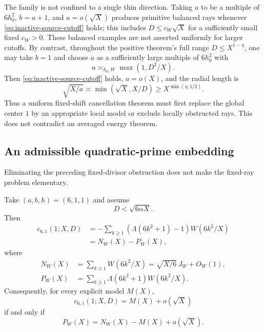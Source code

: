 The family is not confined to a single thin direction.  Taking $a$ to
be a multiple of $6h_0^2$, $b=a+1$, and $a=o(\sqrt X)$ produces primitive
balanced rays whenever \eqref{eq:inactive-source-cutoff} holds; this
includes $D\leq c_W\sqrt X$ for a sufficiently small fixed $c_W>0$.
These balanced examples are not asserted uniformly for larger cutoffs.
By contrast, throughout the positive theorem's full range
$D\leq X^{1-\eta}$, one may take $b=1$ and choose $a$ as a sufficiently
large multiple of $6h_0^2$ with
\[
 a\asymp_{h_0,W}\max(1,D^2/X).
\]
Then \eqref{eq:inactive-source-cutoff} holds, $a=o(X)$, and the radial
length is
\[
 \sqrt{X/a}\asymp\min(\sqrt X,X/D)
 \geq X^{\min(\eta,1/2)}.
\]
Thus a uniform fixed-shift cancellation theorem must first replace the
global center $1$ by an appropriate local model or exclude locally
obstructed rays.  This does not contradict an averaged energy theorem.

\subsection{An admissible quadratic-prime embedding}

Eliminating the preceding fixed-divisor obstruction does not make the
fixed-ray problem elementary.

\begin{theorem}
\label{thm:quadratic-prime-ray}
Take $(a,b,h)=(6,1,1)$ and assume
\begin{equation}
 D<\sqrt{6\alpha X}.
 \label{eq:quadratic-ray-cutoff}
\end{equation}
Then
\begin{equation}
 \begin{aligned}
 c_{6,1}(1;X,D)
 &=-\sum_{k\geq1}(\Lambda(6k^2+1)-1)W(6k^2/X)\\
 &=N_W(X)-P_W(X),
 \end{aligned}
 \label{eq:quadratic-ray-identity}
\end{equation}
where
\begin{align}
 N_W(X)&=\sum_{k\geq1}W(6k^2/X)
 =\sqrt{X/6}\,J_W+O_W(1),
 \label{eq:quadratic-baseline}\\
 P_W(X)&=\sum_{k\geq1}\Lambda(6k^2+1)W(6k^2/X).
 \label{eq:quadratic-prime-sum}
\end{align}
Consequently, for every explicit model $M(X)$,
\begin{equation}
 c_{6,1}(1;X,D)=M(X)+o(\sqrt X)
 \label{eq:coefficient-model}
\end{equation}
if and only if
\begin{equation}
 P_W(X)=N_W(X)-M(X)+o(\sqrt X).
 \label{eq:quadratic-PNT-equivalence}
\end{equation}
\end{theorem}


